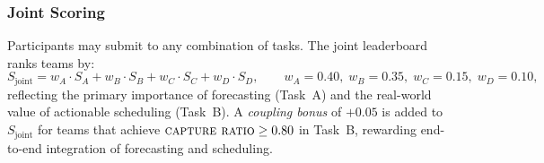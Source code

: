 \subsubsection*{Joint Scoring}

Participants may submit to any combination of tasks.
The joint leaderboard ranks teams by:
\[
  S_{\text{joint}}
  = w_A \cdot S_A
  + w_B \cdot S_B
  + w_C \cdot S_C
  + w_D \cdot S_D,
  \qquad
  w_A = 0.40,\; w_B = 0.35,\; w_C = 0.15,\; w_D = 0.10,
\]
reflecting the primary importance of forecasting (Task~A) and the
real-world value of actionable scheduling (Task~B).
A \emph{coupling bonus} of $+0.05$ is added to $S_{\text{joint}}$ for
teams that achieve $\textsc{capture ratio} \ge 0.80$ in Task~B, rewarding
end-to-end integration of forecasting and scheduling.

